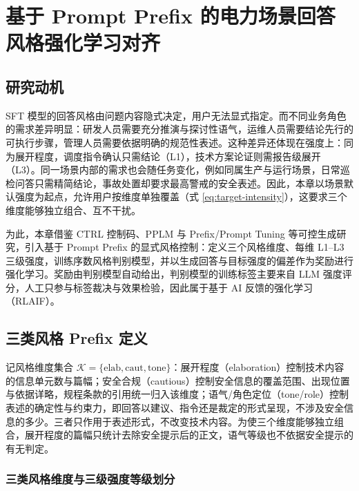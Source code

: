 \documentclass[fontset=fandol,type=master,campus=shenzhen,etitleauto=true]{hithesisbook}
\begin{document}
\chapter{基于 Prompt Prefix 的电力场景回答风格强化学习对齐}\label{ux57faux4e8e-prompt-prefix-ux7684ux7535ux529bux573aux666fux56deux7b54ux98ceux683cux5f3aux5316ux5b66ux4e60ux5bf9ux9f50}

\section{研究动机}\label{ux7814ux7a76ux52a8ux673a-1}

SFT 模型的回答风格由问题内容隐式决定，用户无法显式指定。而不同业务角色的需求差异明显：研发人员需要充分推演与探讨性语气，运维人员需要结论先行的可执行步骤，管理人员需要依据明确的规范性表述。这种差异还体现在强度上：同为展开程度，调度指令确认只需结论（L1），技术方案论证则需报告级展开（L3）。同一场景内部的需求也会随任务变化，例如同属生产与运行场景，日常巡检问答只需精简结论，事故处置却要求最高警戒的安全表述。因此，本章以场景默认强度为起点，允许用户按维度单独覆盖（式 \eqref{eq:target-intensity}），这要求三个维度能够独立组合、互不干扰。

为此，本章借鉴 CTRL 控制码、PPLM 与 Prefix/Prompt Tuning 等可控生成研究\cite{ref36,ref37,ref38,ref39}，引入基于 Prompt Prefix 的显式风格控制：定义三个风格维度、每维 L1--L3 三级强度，训练序数风格判别模型，并以生成回答与目标强度的偏差作为奖励进行强化学习。奖励由判别模型自动给出，判别模型的训练标签主要来自 LLM 强度评分，人工只参与标签裁决与效果检验，因此属于基于 AI 反馈的强化学习（RLAIF）\cite{ref44,ref90}。

\section{三类风格 Prefix 定义}\label{ux4e09ux7c7bux98ceux683c-prefix-ux5b9aux4e49}

记风格维度集合 $\mathcal{K} = \{\text{elab}, \text{caut}, \text{tone}\}$：展开程度（elaboration）控制技术内容的信息单元数与篇幅；安全合规（cautious）控制安全信息的覆盖范围、出现位置与依据详略，规程条款的引用统一归入该维度；语气/角色定位（tone/role）控制表述的确定性与约束力，即回答以建议、指令还是裁定的形式呈现，不涉及安全信息的多少。三者只作用于表述形式，不改变技术内容。为使三个维度能够独立组合，展开程度的篇幅只统计去除安全提示后的正文，语气等级也不依据安全提示的有无判定。

\subsection{三类风格维度与三级强度等级划分}\label{ux98ceux683cux5f3aux5ea6ux7b49ux7ea7ux5212ux5206}
\end{document}
